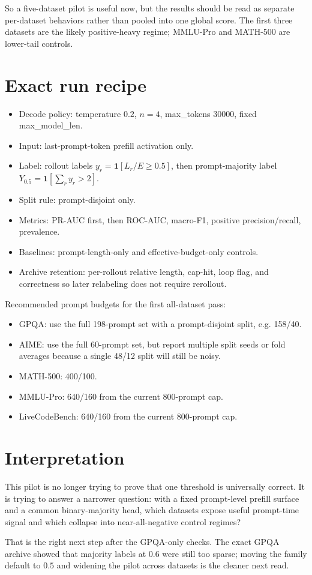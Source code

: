 \documentclass[11pt]{article}
\begin{document}
So a five-dataset pilot is useful now, but the results should be read as separate per-dataset behaviors rather than pooled into one global score. The first three datasets are the likely positive-heavy regime; MMLU-Pro and MATH-500 are lower-tail controls.

\section*{Exact run recipe}
\begin{itemize}[leftmargin=1.5em]
\item Decode policy: temperature $0.2$, $n=4$, max\_tokens $30000$, fixed max\_model\_len.
\item Input: last-prompt-token prefill activation only.
\item Label: rollout labels $y_r = \mathbf{1}[L_r / E \ge 0.5]$, then prompt-majority label $Y_{0.5} = \mathbf{1}[\sum_r y_r > 2]$.
\item Split rule: prompt-disjoint only.
\item Metrics: PR-AUC first, then ROC-AUC, macro-F1, positive precision/recall, prevalence.
\item Baselines: prompt-length-only and effective-budget-only controls.
\item Archive retention: per-rollout relative length, cap-hit, loop flag, and correctness so later relabeling does not require rerollout.
\end{itemize}

Recommended prompt budgets for the first all-dataset pass:
\begin{itemize}[leftmargin=1.5em]
\item GPQA: use the full 198-prompt set with a prompt-disjoint split, e.g. 158/40.
\item AIME: use the full 60-prompt set, but report multiple split seeds or fold averages because a single 48/12 split will still be noisy.
\item MATH-500: 400/100.
\item MMLU-Pro: 640/160 from the current 800-prompt cap.
\item LiveCodeBench: 640/160 from the current 800-prompt cap.
\end{itemize}

\section*{Interpretation}
This pilot is no longer trying to prove that one threshold is universally correct. It is trying to answer a narrower question: with a fixed prompt-level prefill surface and a common binary-majority head, which datasets expose useful prompt-time signal and which collapse into near-all-negative control regimes?

That is the right next step after the GPQA-only checks. The exact GPQA archive showed that majority labels at $0.6$ were still too sparse; moving the family default to $0.5$ and widening the pilot across datasets is the cleaner next read.
\end{document}
